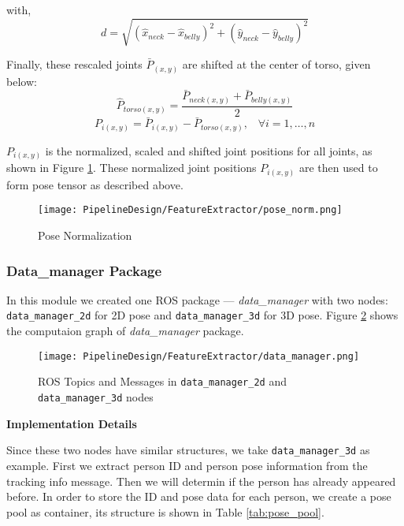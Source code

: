 with, 
\begin{equation}
d = \sqrt{(\hat{x}_{neck} - \hat{x}_{belly})^2 + (\hat{y}_{neck} - \hat{y}_{belly})^2}
\end{equation} 

Finally, these rescaled joints $\bar{P}_{(x,y)}$ are shifted at the center of torso, given below:
\begin{equation}
\hat{P}_{torso(x,y)} = \frac{\bar{P}_{neck(x,y)} + \bar{P}_{belly(x,y)}}{2}
\end{equation} 
\begin{equation}
P_{i(x,y)} = \bar{P}_{i(x,y)} - \bar{P}_{torso(x,y)}, \;\;\; \forall i = 1, \dots, n
\end{equation}

$P_{i(x,y)}$ is the normalized, scaled and shifted joint positions for all joints, as shown in Figure \ref{fig:pose_norm}. These normalized joint positions $P_{i(x,y)}$ are then used to form pose tensor as described above.   

\begin{figure}[h!]
  \centering
  \texttt{[image: PipelineDesign/FeatureExtractor/pose\_norm.png]}
  \caption{Pose Normalization \cite{usman2018}}
  \label{fig:pose_norm}
\end{figure}  

\subsubsection{Data\_manager Package}
In this module we created one ROS package --- \textit{data\_manager} with two nodes: \texttt{data\_manager\_2d} for 2D pose and \texttt{data\_manager\_3d} for 3D pose. Figure \ref{fig:data_manager} shows the computaion graph of \textit{data\_manager} package.

\begin{figure}[h!]
  \centering
  \texttt{[image: PipelineDesign/FeatureExtractor/data\_manager.png]}
  \caption{ROS Topics and Messages in \texttt{data\_manager\_2d} and \texttt{data\_manager\_3d} nodes}  
  \label{fig:data_manager}
\end{figure}  

\textbf{Implementation Details}

Since these two nodes have similar structures, we take \texttt{data\_manager\_3d} as example. First we extract person ID and person pose information from the tracking info message. Then we will determin if the person has already appeared before. In order to store the ID and pose data for each person, we create a pose pool as container, its structure is shown in Table \ref{tab:pose_pool}. \\

